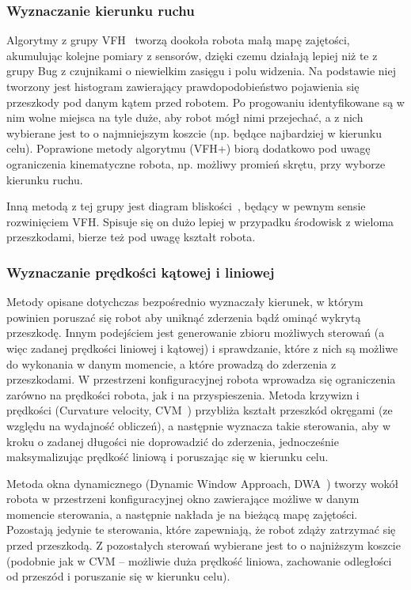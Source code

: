 \subsubsection{Wyznaczanie kierunku ruchu}

Algorytmy z grupy VFH~\cite{borenstein1991vector} tworzą dookoła robota małą mapę zajętości, akumulując kolejne
pomiary z sensorów, dzięki czemu działają lepiej niż te z grupy Bug z czujnikami
o niewielkim zasięgu i polu widzenia. Na podstawie niej tworzony jest histogram
zawierający prawdopodobieństwo pojawienia się przeszkody pod danym kątem przed robotem.
Po progowaniu identyfikowane są w nim wolne miejsca na tyle duże, aby robot mógł
nimi przejechać, a z nich wybierane jest to o najmniejszym koszcie (np. będące najbardziej
w kierunku celu). Poprawione metody algorytmu (VFH+) biorą dodatkowo pod uwagę
ograniczenia kinematyczne robota, np. możliwy promień skrętu, przy wyborze kierunku ruchu.

Inną metodą z tej grupy jest diagram bliskości~\cite{minguez2004nearness}, będący w pewnym sensie rozwinięciem VFH.
Spisuje się on dużo lepiej w przypadku środowisk z wieloma przeszkodami, bierze też
pod uwagę kształt robota.

\subsubsection{Wyznaczanie prędkości kątowej i liniowej}

Metody opisane dotychczas bezpośrednio wyznaczały kierunek, w którym powinien poruszać
się robot aby uniknąć zderzenia bądź ominąć wykrytą przeszkodę. Innym podejściem
jest generowanie zbioru możliwych sterowań (a więc zadanej prędkości liniowej i kątowej)
i sprawdzanie, które z nich są możliwe do wykonania w danym momencie, a które prowadzą
do zderzenia z przeszkodami. W przestrzeni konfiguracyjnej robota wprowadza się ograniczenia
zarówno na prędkości robota, jak i na przyspieszenia. Metoda krzywizn i prędkości
(Curvature velocity, CVM~\cite{511023}) przybliża kształt przeszkód okręgami (ze względu na wydajność
obliczeń), a następnie wyznacza takie sterowania, aby w kroku o zadanej długości
nie doprowadzić do zderzenia, jednocześnie maksymalizując prędkość liniową i poruszając
się w kierunku celu.

Metoda okna dynamicznego (Dynamic Window Approach, DWA~\cite{fox1997dynamic}) tworzy wokół robota w przestrzeni
konfiguracyjnej okno zawierające możliwe w danym momencie sterowania, a następnie nakłada
je na bieżącą mapę zajętości. Pozostają jedynie te sterowania, które zapewniają,
że robot zdąży zatrzymać się przed przeszkodą. Z pozostałych sterowań wybierane jest
to o najniższym koszcie (podobnie jak w CVM -- możliwie duża prędkość liniowa,
zachowanie odległości od przeszód i poruszanie się w kierunku celu).
